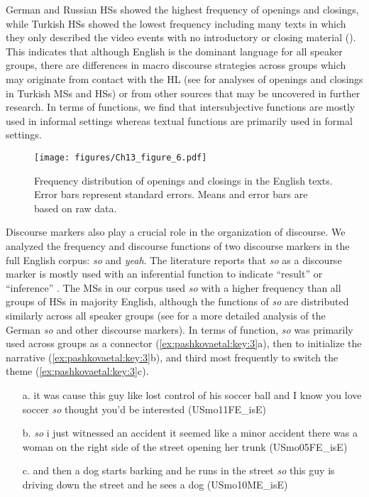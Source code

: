 \documentclass[output=paper,colorlinks,citecolor=brown]{langscibook}
\begin{document}
German and Russian HSs showed the highest frequency of openings and closings, while Turkish HSs showed the lowest frequency including many texts in which they only described the video events with no introductory or closing material (). This indicates that although English is the dominant language for all speaker groups, there are differences in macro discourse strategies across groups which may originate from contact with the HL (see  for analyses of openings and closings in Turkish MSs and HSs) or from other sources that may be uncovered in further research. In terms of functions, we find that intersubjective functions are mostly used in informal settings whereas textual functions are primarily used in formal settings.

\begin{figure}
    \texttt{[image: figures/Ch13\_figure\_6.pdf]}
    \caption{Frequency distribution of openings and closings in the English texts. Error bars represent standard errors. Means and error bars are based on raw data.}
    \label{fig:pashkovaetal:6}
\end{figure}

Discourse markers also play a crucial role in the organization of discourse. We analyzed the frequency and discourse functions of two discourse markers in the full English corpus: {\textit{so}} {and} {\textit{yeah}}{. The literature reports that} {\textit{so}} {as a discourse marker is mostly used with an inferential function to indicate “result” or “inference” \parencite{Schiffrin1987}. The MSs in our corpus used} {\textit{so}} {with a higher frequency than all groups of HSs in majority English, although the functions of} {\textit{so}} {are distributed similarly across all speaker groups (see  for a more detailed analysis of the German} {\textit{so}} {and other discourse markers). In terms of function, \textit{so} was primarily used across groups as a connector (\ref{ex:pashkovaetal:key:3}a), then to initialize the narrative (\ref{ex:pashkovaetal:key:3}b), and third most frequently to switch the theme (\ref{ex:pashkovaetal:key:3}c).}

\ea%
\label{ex:pashkovaetal:key:3}
\begin{enumerate}
    \item[a.] it was cause this guy like lost control of his soccer ball and I know you love soccer \textit{so} thought you’d be interested  (USmo11FE\_isE)
    \item[b.] \textit{so} i just witnessed an accident it seemed like a minor accident there was a woman on the right side of the street opening her trunk  (USmo05FE\_isE)
    \item[c.] and then a dog starts barking and he runs in the street \textit{so} this guy is driving down the street and he sees a dog  (USmo10ME\_isE) 
\end{enumerate}
\z 
\end{document}

